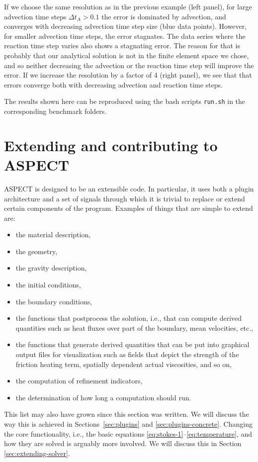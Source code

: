 \documentclass{article}
\newcommand{\aspect}{\textsc{ASPECT}}
\begin{document}
If we choose the same resolution as in the previous example (left panel), for large advection time steps $\Delta t_A > 0.1$ the error is dominated by advection, and converges with decreasing advection time step size (blue data points). However, for smaller advection time steps, the error stagnates. The data series where the reaction time step varies also shows a stagnating error. The reason for that is probably that our analytical solution is not in the finite element space we chose, and so neither decreasing the advection or the reaction time step will improve the error. 
If we increase the resolution by a factor of 4 (right panel), we see that that errors converge both with decreasing advection and reaction time steps.  

The results shown here can be reproduced using the bash scripts \texttt{run.sh} in the corresponding benchmark folders. 

\section{Extending and contributing to \aspect}
\label{sec:extending}

\aspect{} is designed to be an extensible code. In particular, it
uses both a plugin architecture and a set of signals through which it is
trivial to replace or extend certain components of the program. Examples of
things that are simple to extend are:
\begin{itemize}
\item the material description,
\item the geometry,
\item the gravity description,
\item the initial conditions,
\item the boundary conditions,
\item the functions that postprocess the solution, i.e., that can compute
  derived quantities such as heat fluxes over part of the boundary, mean
  velocities, etc.,
\item the functions that generate derived quantities that can be put into
  graphical output files for visualization such as fields that depict the
  strength of the friction heating term, spatially dependent actual
  viscosities, and so on,
\item the computation of refinement indicators,
\item the determination of how long a computation should run.
\end{itemize}
This list may also have grown since this section was written.
We will discuss the way this is achieved in Sections~\ref{sec:plugins} and
\ref{sec:plugins-concrete}. Changing the core functionality, i.e., the basic equations
\eqref{eq:stokes-1}--\eqref{eq:temperature}, and how they are solved is
arguably more involved. We will discuss this in Section
\ref{sec:extending-solver}.
\end{document}
